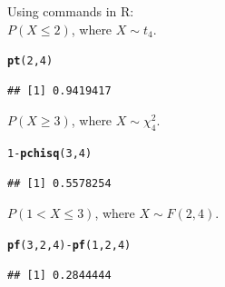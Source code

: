 \documentclass[t,xcolor=pdftex,dvipsnames,table]{beamer}\usepackage[]{graphicx}\usepackage[]{color}
\makeatletter
\newcommand{\hlnum}[1]{\textcolor[rgb]{0.686,0.059,0.569}{#1}}%
\newcommand{\hlopt}[1]{\textcolor[rgb]{0,0,0}{#1}}%
\newcommand{\hlstd}[1]{\textcolor[rgb]{0.345,0.345,0.345}{#1}}%
\newcommand{\hlkwd}[1]{\textcolor[rgb]{0.737,0.353,0.396}{\textbf{#1}}}%
\newenvironment{kframe}{%
 \def\at@end@of@kframe{}%
 \ifinner\ifhmode%
  \def\at@end@of@kframe{\end{minipage}}%
  \begin{minipage}{\columnwidth}%
 \fi\fi%
 \def\FrameCommand##1{\hskip\@totalleftmargin \hskip-\fboxsep
 \colorbox{shadecolor}{##1}\hskip-\fboxsep
     \hskip-\linewidth \hskip-\@totalleftmargin \hskip\columnwidth}%
 \MakeFramed {\advance\hsize-\width
   \@totalleftmargin\z@ \linewidth\hsize
   \@setminipage}}%
 {\par\unskip\endMakeFramed%
 \at@end@of@kframe}
\newenvironment{knitrout}{}{} %
\makeatother
\begin{document}
\begin{frame}[fragile]\frametitle{}
 
Using commands in R: \\

$P(X \leq 2)$, where $X \sim t_{4}$.

\begin{knitrout}
\color{fgcolor}\begin{kframe}
\begin{alltt}
\hlkwd{pt}\hlstd{(}\hlnum{2}\hlstd{,}\hlnum{4}\hlstd{)}
\end{alltt}
\begin{verbatim}
## [1] 0.9419417
\end{verbatim}
\end{kframe}
\end{knitrout}

$P(X \geq 3)$, where $X \sim \chi^2_{4}$.

\begin{knitrout}
\color{fgcolor}\begin{kframe}
\begin{alltt}
\hlnum{1}\hlopt{-}\hlkwd{pchisq}\hlstd{(}\hlnum{3}\hlstd{,}\hlnum{4}\hlstd{)}
\end{alltt}
\begin{verbatim}
## [1] 0.5578254
\end{verbatim}
\end{kframe}
\end{knitrout}

$P(1 < X \leq 3)$, where $X \sim F(2,4)$.

\begin{knitrout}
\color{fgcolor}\begin{kframe}
\begin{alltt}
\hlkwd{pf}\hlstd{(}\hlnum{3}\hlstd{,}\hlnum{2}\hlstd{,}\hlnum{4}\hlstd{)}\hlopt{-}\hlkwd{pf}\hlstd{(}\hlnum{1}\hlstd{,}\hlnum{2}\hlstd{,}\hlnum{4}\hlstd{)}
\end{alltt}
\begin{verbatim}
## [1] 0.2844444
\end{verbatim}
\end{kframe}
\end{knitrout}

\end{frame}
\end{document}
